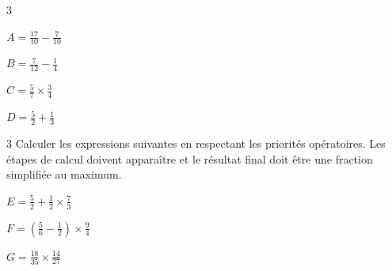 \documentclass[a4paper]{book}
\begin{document}
{\begin{exerciceNote}{3}
        \smallskip
        \begin{minipage}[t]{0.23\textwidth}
            $A = \frac{17}{10} - \frac{7}{10}$
            \vspace{3cm}
        \end{minipage}\hfill \vline \hfill
        \begin{minipage}[t]{0.23\textwidth}
            $B = \frac{7}{12} - \frac{1}{4}$
            \vspace{3cm}
        \end{minipage}\hfill \vline \hfill
        \begin{minipage}[t]{0.23\textwidth}
            $C = \frac{5}{7} \times \frac{3}{4}$
            \vspace{3cm}
        \end{minipage}\hfill \vline \hfill
        \begin{minipage}[t]{0.23\textwidth}
            $D = \frac{5}{2}+\frac{1}{3}$
            \vspace{3cm}
        \end{minipage}
    \end{exerciceNote}


\newpage

    
    \begin{exerciceNote}{3}
        Calculer les expressions suivantes en respectant les priorités opératoires. Les étapes de calcul doivent apparaître et le résultat final doit être une fraction simplifiée au maximum.
        
        \vspace{0.5cm}
        \begin{minipage}[t]{0.31\textwidth}
            $E = \frac{5}{2} + \frac{1}{2} \times \frac{7}{3}$
            \vspace{4cm}
        \end{minipage}\hfill \vline \hfill
        \begin{minipage}[t]{0.31\textwidth}
            $F = \left( \frac{5}{6} - \frac{1}{2} \right) \times \frac{9}{4}$
            \vspace{4cm}
        \end{minipage}\hfill \vline \hfill
        \begin{minipage}[t]{0.31\textwidth}
            $G = \frac{18}{35} \times \frac{14}{27}$ \\
            \vspace{4cm}
        \end{minipage}
    \end{exerciceNote}
    
}
\end{document}
